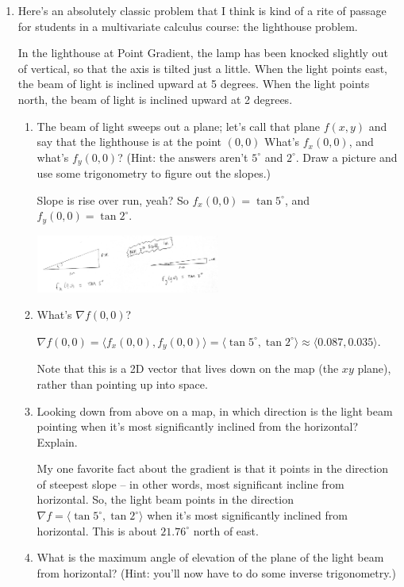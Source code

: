 \documentclass[10pt]{article}
\newcommand\del\nabla
\newenvironment{red}{\color{red}}{\ignorespacesafterend}
\begin{document}
\begin{enumerate}[leftmargin=0pt]
    \item Here's an absolutely classic problem that I think is kind of a rite of passage for students in a multivariate calculus course: the lighthouse problem.
    
    In the lighthouse at Point Gradient, the lamp has been knocked slightly out of vertical, so that the axis is tilted just a little. When the light points east, the beam of light is inclined upward at 5 degrees. When the light points north, the beam of light is inclined upward at 2 degrees.
    
    \begin{enumerate}
        \item The beam of light sweeps out a plane; let's call that plane $f(x, y)$ and say that the lighthouse is at the point $(0, 0)$ What's $f_x(0, 0)$, and what's $f_y(0, 0)$? (Hint: the answers aren't $5^\circ$ and $2^\circ$. Draw a picture and use some trigonometry to figure out the slopes.)
        
        \begin{red}
        Slope is rise over run, yeah? So $f_x(0, 0) = \tan 5^\circ$, and  $f_y(0, 0) = \tan 2^\circ$.
        
        \begin{center}
        \includegraphics[width=0.5\textwidth]{203-keys/ps8-answer-key/triangles.jpg}
        \end{center}
        \end{red}
        \item What's $\del f(0, 0)$? 
        
        \begin{red}
        $\del f(0, 0) = \langle f_x(0, 0), f_y(0, 0) \rangle = \langle \tan 5^\circ, \tan 2^\circ\rangle \approx \langle 0.087, 0.035\rangle$. 
        
        Note that this is a 2D vector that lives down on the map (the $xy$ plane), rather than pointing up into space.
        \end{red}
        \item Looking down from above on a map, in which direction is the light beam pointing when it's most significantly inclined from the horizontal? Explain. 
        
        \begin{red}
        My one favorite fact about the gradient is that it points in the direction of steepest slope -- in other words, most significant incline from horizontal. So, the light beam points in the direction $\del f = \langle \tan 5^\circ, \tan 2^\circ\rangle$ when it's most significantly inclined from horizontal. This is about $21.76^\circ$ north of east.
        \end{red}
        \item What is the maximum angle of elevation of the plane of the light beam from horizontal? (Hint: you'll now have to do some inverse trigonometry.) 
        

\end{enumerate}
\end{enumerate}
\end{document}
